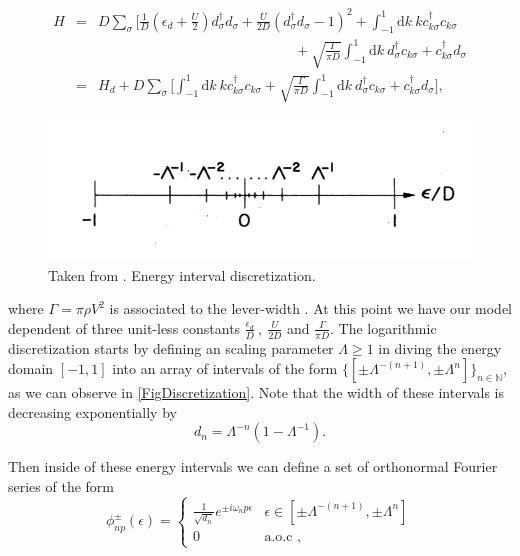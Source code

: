 \begin{eqnarray}
H & = & D\sum_{\sigma}\Biggl[\frac{1}{D}\left(\epsilon_{d}+\frac{U}{2}\right)d_{\sigma}^{\dagger}d_{\sigma}+\frac{U}{2D}(d_{\sigma}^{\dagger}d_{\sigma}-1)^{2}+\int_{-1}^{1}\mbox{d}k\ kc_{k\sigma}^{\dagger}c_{k\sigma}\nonumber \\
 &  & \qquad\qquad\qquad\qquad\qquad\qquad\qquad+\sqrt{\frac{\Gamma}{\pi D}}\int_{-1}^{1}\mbox{d}k\ d_{\sigma}^{\dagger}c_{k\sigma}+c_{k\sigma}^{\dagger}d_{\sigma}\label{eq:Norm-HamEnergy}\\
 & = & H_{d}+D\sum_{\sigma}\Biggl[\int_{-1}^{1}\mbox{d}k\ kc_{k\sigma}^{\dagger}c_{k\sigma}+\sqrt{\frac{\Gamma}{\pi D}}\int_{-1}^{1}\mbox{d}k\ d_{\sigma}^{\dagger}c_{k\sigma}+c_{k\sigma}^{\dagger}d_{\sigma}\Biggr],
\end{eqnarray}


\begin{figure}[h]
\centering
\includegraphics[scale=0.3]{IMAGES/Log-disc.png}\caption{\label{FigDiscretization} Taken from \citep{krishna-murthy_renormalization-group_1980}.
Energy interval discretization. \label{Energy-interval-discretization}}
\end{figure}


where $\Gamma=\pi\rho V^{2}$ is associated to the lever-width \citep[(3.5)]{sindel_numerical_2005}.
At this point we have our model dependent of three unit-less constants
$\frac{\epsilon_{d}}{D}\ ,\ \frac{U}{2D}$ and $\frac{\Gamma}{\pi D}$.
The logarithmic discretization starts by defining an scaling parameter
$\Lambda\geq1$ in diving the energy domain $[-1,1]$ into an array
of intervals of the form $\{[\pm\Lambda^{-(n+1)},\pm\Lambda^{n}]\}_{n\in\mathbb{N}}$,
as we can observe in \ref{FigDiscretization}. Note that the width
of these intervals is decreasing exponentially by 
\[
d_{n}=\Lambda^{-n}\left(1-\Lambda^{-1}\right).
\]


Then inside of these energy intervals we can define a set of orthonormal
Fourier series of the form
\begin{equation}
\phi_{np}^{\pm}(\epsilon)=\begin{cases}
\frac{1}{\sqrt{d_{n}}}e^{\pm i\omega_{n}p\epsilon} & \epsilon\in[\pm\Lambda^{-(n+1)},\pm\Lambda^{n}]\\
0 & \mbox{a.o.c },
\end{cases}\label{eq:orthonormal-Fourier}
\end{equation}


